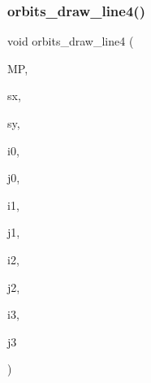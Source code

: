 \subsubsection{\texorpdfstring{orbits\+\_\+draw\+\_\+line4()}{orbits\_draw\_line4()}}
{\footnotesize\ttfamily void orbits\+\_\+draw\+\_\+line4 (\begin{DoxyParamCaption}\item[{\mbox{\hyperlink{classmp__graphics}{mp\+\_\+graphics}} \&}]{MP,  }\item[{\mbox{\hyperlink{galois_8h_a09fddde158a3a20bd2dcadb609de11dc}{I\+NT}}}]{sx,  }\item[{\mbox{\hyperlink{galois_8h_a09fddde158a3a20bd2dcadb609de11dc}{I\+NT}}}]{sy,  }\item[{\mbox{\hyperlink{galois_8h_a09fddde158a3a20bd2dcadb609de11dc}{I\+NT}}}]{i0,  }\item[{\mbox{\hyperlink{galois_8h_a09fddde158a3a20bd2dcadb609de11dc}{I\+NT}}}]{j0,  }\item[{\mbox{\hyperlink{galois_8h_a09fddde158a3a20bd2dcadb609de11dc}{I\+NT}}}]{i1,  }\item[{\mbox{\hyperlink{galois_8h_a09fddde158a3a20bd2dcadb609de11dc}{I\+NT}}}]{j1,  }\item[{\mbox{\hyperlink{galois_8h_a09fddde158a3a20bd2dcadb609de11dc}{I\+NT}}}]{i2,  }\item[{\mbox{\hyperlink{galois_8h_a09fddde158a3a20bd2dcadb609de11dc}{I\+NT}}}]{j2,  }\item[{\mbox{\hyperlink{galois_8h_a09fddde158a3a20bd2dcadb609de11dc}{I\+NT}}}]{i3,  }\item[{\mbox{\hyperlink{galois_8h_a09fddde158a3a20bd2dcadb609de11dc}{I\+NT}}}]{j3 }\end{DoxyParamCaption})}

\mbox{\label{draw_8_c_a2c437e67c2fe1c2693cccb961c9c185e}} 
